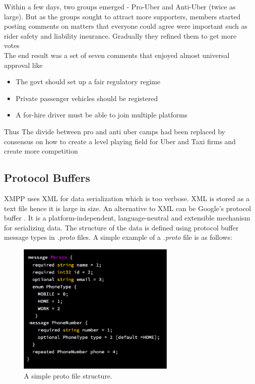 \documentclass[11pt, conference, a4paper]{IEEEtran}
\begin{document}
Within a few days, two groups emerged - Pro-Uber and Anti-Uber (twice as large). But as the groups sought to attract more supporters, members started posting comments on matters that everyone could agree were important such as rider safety and liability insurance. Gradually they refined them to get more votes\\
The end result was a set of seven comments that enjoyed almost universal approval  like
\begin{itemize}
  \item The govt should set up a fair regulatory regime
  \item Private passenger vehicles should be registered
  \item A for-hire driver must be able to join multiple platforms
\end{itemize}
Thus The divide between pro and anti uber camps had been replaced by consensus on how to create a level playing field for Uber and Taxi firms and create more competition
\subsection{Protocol Buffers}
XMPP uses XML for data serialization which is too verbose.  XML is stored as a text file hence it is large in size. An alternative to XML can be Google’s protocol buffer \cite{prot-buff}. It is a platform-independent, language-neutral and extensible mechanism for serializing data. The structure of the data is defined using protocol buffer message types in  \textit{.proto} files.  A simple example of a \textit{.proto} file is as follows: 

\begin{figure}[H]
\begin{center}
  \includegraphics[width=3in]{proto_file.png}
  \caption{A simple proto file structure.\cite{prot-buff}}
\end{center}
\end{figure}
\end{document}
